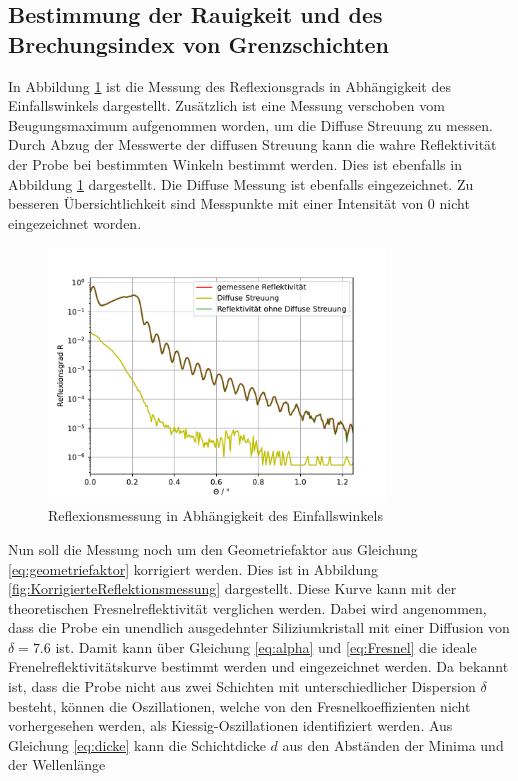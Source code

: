 \subsection{Bestimmung der Rauigkeit und des Brechungsindex von Grenzschichten}
In Abbildung \ref{fig:Reflektionsmessung} ist die Messung des Reflexionsgrads in Abhängigkeit des Einfallswinkels dargestellt.
Zusätzlich ist eine Messung verschoben vom Beugungsmaximum aufgenommen worden, um die Diffuse Streuung zu messen. Durch Abzug der Messwerte 
der diffusen Streuung kann die wahre Reflektivität der Probe bei bestimmten Winkeln bestimmt werden. Dies ist ebenfalls in Abbildung \ref{fig:Reflektionsmessung} dargestellt.
Die Diffuse Messung ist ebenfalls eingezeichnet. Zu besseren Übersichtlichkeit sind Messpunkte mit einer Intensität von 0 nicht eingezeichnet worden.
\begin{figure}[H]
    \centering
    \includegraphics[width=0.8\textwidth]{plots/Reflektionsmessung.pdf}
    \caption{Reflexionsmessung in Abhängigkeit des Einfallswinkels}
    \label{fig:Reflektionsmessung}
\end{figure}
Nun soll die Messung noch um den Geometriefaktor aus Gleichung \eqref{eq:geometriefaktor} korrigiert werden. Dies ist in Abbildung \ref{fig:KorrigierteReflektionsmessung} dargestellt.
Diese Kurve kann mit der theoretischen Fresnelreflektivität verglichen werden. Dabei wird angenommen, dass die Probe ein unendlich ausgedehnter Siliziumkristall mit 
einer Diffusion von $\delta=7.6$ \cite{m-tolan2013} ist. Damit kann über Gleichung \eqref{eq:alpha} und \eqref{eq:Fresnel} die ideale Frenelreflektivitätskurve bestimmt werden und eingezeichnet werden.
Da bekannt ist, dass die Probe nicht aus zwei Schichten mit unterschiedlicher Dispersion $\delta$ besteht, können die Oszillationen, welche von den 
Fresnelkoeffizienten nicht vorhergesehen werden, als Kiessig-Oszillationen identifiziert werden. Aus Gleichung \eqref{eq:dicke} kann die Schichtdicke $d$ aus den Abständen der Minima und der Wellenlänge 
